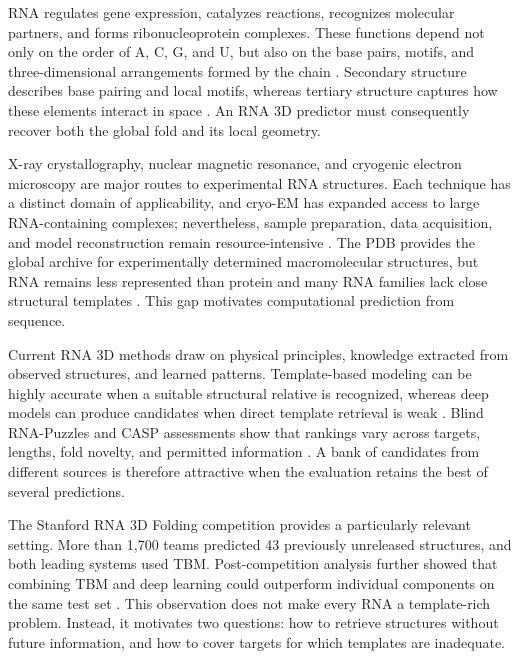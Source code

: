 \documentclass[12pt,a4paper,oneside]{report}
\begin{document}
RNA regulates gene expression, catalyzes reactions, recognizes molecular partners, and
forms ribonucleoprotein complexes. These functions depend not only on the order of A, C,
G, and U, but also on the base pairs, motifs, and three-dimensional arrangements formed
by the chain \cite{cao_rna_functions,tinoco_folding,butcher_tertiary}. Secondary
structure describes base pairing and local motifs, whereas tertiary structure captures
how these elements interact in space \cite{tinoco_folding,butcher_tertiary}. An RNA 3D
predictor must consequently recover both the global fold and its local geometry.

X-ray crystallography, nuclear magnetic resonance, and cryogenic electron microscopy
are major routes to experimental RNA structures. Each technique has a distinct domain
of applicability, and cryo-EM has expanded access to large RNA-containing complexes;
nevertheless, sample preparation, data acquisition, and model reconstruction remain
resource-intensive \cite{zhang_experimental_review,ma_cryoem}. The PDB provides the
global archive for experimentally determined macromolecular structures, but RNA remains
less represented than protein and many RNA families lack close structural templates
\cite{pdb_archive,zhang_experimental_review}. This gap motivates computational
prediction from sequence.

Current RNA 3D methods draw on physical principles, knowledge extracted from observed
structures, and learned patterns. Template-based modeling can be highly accurate when a
suitable structural relative is recognized, whereas deep models can produce candidates
when direct template retrieval is weak \cite{rna_progress_review,drfold,rhofoldplus,
drfold2}. Blind RNA-Puzzles and CASP assessments show that rankings vary across targets,
lengths, fold novelty, and permitted information \cite{rna_puzzles,casp15,
state_of_rnart}. A bank of candidates from different sources is therefore attractive
when the evaluation retains the best of several predictions.

The Stanford RNA 3D Folding competition provides a particularly relevant setting. More
than 1,700 teams predicted 43 previously unreleased structures, and both leading systems
used TBM. Post-competition analysis further showed that combining TBM and deep learning
could outperform individual components on the same test set \cite{competition_paper}.
This observation does not make every RNA a template-rich problem. Instead, it motivates
two questions: how to retrieve structures without future information, and how to cover
targets for which templates are inadequate.
\end{document}
